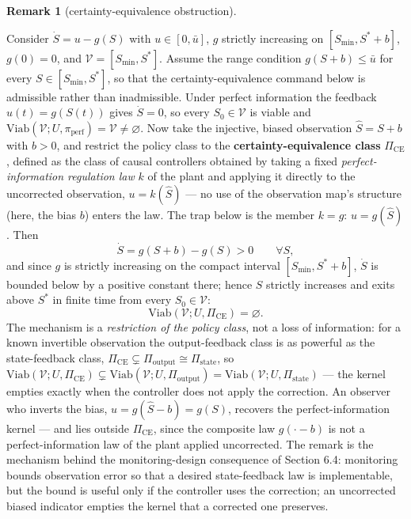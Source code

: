 \documentclass[11pt]{article}
\theoremstyle{definition}
\newtheorem{remark}{Remark}
\begin{document}
\begin{remark}[certainty-equivalence obstruction]\label{rem:ce-trap}

Consider
\(\dot S = u - g(S)\) with \(u \in [0, \bar u]\), \(g\) strictly
increasing on \([S_{\min}, S^* + b]\), \(g(0) = 0\), and
\(\mathcal{V} = [S_{\min}, S^*]\). Assume the range condition
\(g(S + b) \le \bar u\) for every \(S \in [S_{\min}, S^*]\), so that the
certainty-equivalence command below is admissible rather than
inadmissible. Under perfect information the feedback \(u(t) = g(S(t))\)
gives \(\dot S = 0\), so every \(S_0 \in \mathcal{V}\) is viable and
\(\mathrm{Viab}(\mathcal{V}; U, \pi_{\mathrm{perf}}) = \mathcal{V} \neq \varnothing\).
Now take the injective, biased observation \(\hat S = S + b\) with
\(b > 0\), and restrict the policy class to the
\textbf{certainty-equivalence class} \(\Pi_{\mathrm{CE}}\), defined as the class of causal controllers obtained by taking a fixed \emph{perfect-information
regulation law} \(k\) of the plant and applying it directly to the
uncorrected observation, \(u = k(\hat S)\) --- no use of the observation
map's structure (here, the bias \(b\)) enters the law. The trap below is
the member \(k = g\): \(u = g(\hat S)\). Then
\[\dot S = g(S + b) - g(S) > 0 \qquad \forall S,\] and since \(g\) is
strictly increasing on the compact interval \([S_{\min}, S^* + b]\),
\(\dot S\) is bounded below by a positive constant there; hence \(S\)
strictly increases and exits above \(S^*\) in finite time from every
\(S_0 \in \mathcal{V}\):
\[\mathrm{Viab}(\mathcal{V}; U, \Pi_{\mathrm{CE}}) = \varnothing.\] The
mechanism is a \emph{restriction of the policy class}, not a loss of
information: for a known invertible observation the output-feedback
class is as powerful as the state-feedback class,
\(\Pi_{\mathrm{CE}} \subsetneq \Pi_{\mathrm{output}} \cong \Pi_{\mathrm{state}}\),
so
\(\mathrm{Viab}(\mathcal{V}; U, \Pi_{\mathrm{CE}}) \subsetneq \mathrm{Viab}(\mathcal{V}; U, \Pi_{\mathrm{output}}) = \mathrm{Viab}(\mathcal{V}; U, \Pi_{\mathrm{state}})\)
--- the kernel empties exactly when the controller does not apply the correction. An observer who inverts the bias,
\(u = g(\hat S - b) = g(S)\), recovers the perfect-information kernel
--- and lies outside \(\Pi_{\mathrm{CE}}\), since the composite law
\(g(\cdot - b)\) is not a perfect-information law of the plant applied
uncorrected. The remark is the mechanism behind the monitoring-design
consequence of Section 6.4: monitoring bounds observation error so that
a desired state-feedback law is implementable, but the bound is useful
only if the controller uses the correction; an uncorrected biased
indicator empties the kernel that a corrected one preserves.

\end{remark}
\end{document}
